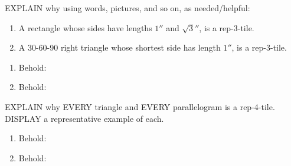 \documentclass[handout,nooutcomes,noauthor,hints]{ximera}
\begin{document}
\begin{question}
EXPLAIN why using words, pictures, and so on, as needed/helpful:
\begin{enumerate}
\item A rectangle whose sides have lengths $1''$ and $\sqrt{3}''$, is a rep-3-tile.
\item A 30-60-90 right triangle whose shortest side has length $1''$, is a rep-3-tile.
\end{enumerate}
\begin{freeResponse}
  \begin{enumerate}
  \item Behold:
  \item Behold:
  \end{enumerate}
\end{freeResponse}
\end{question}
\mynewpage



\begin{question}
EXPLAIN why EVERY triangle and EVERY parallelogram is a rep-4-tile.
DISPLAY a representative example of each.
\begin{freeResponse}
  \begin{enumerate}
  \item Behold:
  \item Behold:
  \end{enumerate}
\end{freeResponse}
\end{question}
\end{document}
